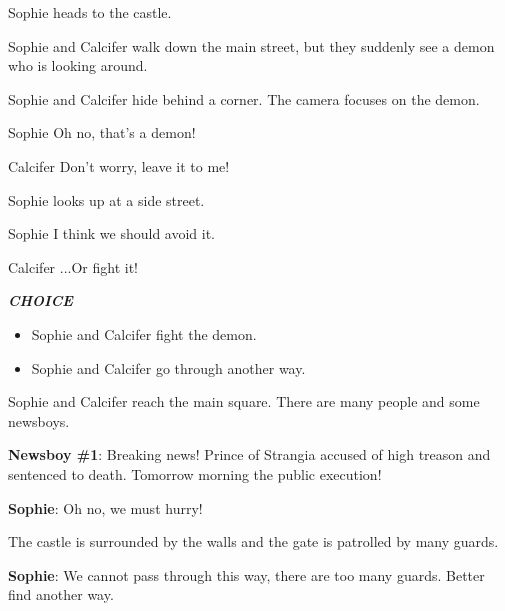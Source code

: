 \vspace{1em}

Sophie heads to the castle.


Sophie and Calcifer walk down the main street, but they suddenly see a demon who is looking around.

\begin{screenplay}

Sophie and Calcifer hide behind a corner. The camera focuses on the demon.

\begin{dialogue}[worried]{Sophie}
Oh no, that’s a demon!
\end{dialogue}
\begin{dialogue}[feisty]{Calcifer}
Don’t worry, leave it to me!
\end{dialogue}

Sophie looks up at a side street.

\begin{dialogue}{Sophie}
I think we should avoid it.
\end{dialogue}

\begin{dialogue}{Calcifer}
...Or fight it!
\end{dialogue}
\end{screenplay}
\vspace{1em}

\textit{\textbf{CHOICE}}
\begin{itemize}
  \item Sophie and Calcifer fight the demon.
  \item Sophie and Calcifer go through another way.
\end{itemize}
  
Sophie and Calcifer reach the main square. There are many people and some newsboys.

\textbf{Newsboy \#{}1}: Breaking news! Prince of Strangia accused of high treason and sentenced to death. Tomorrow morning the public execution!

\textbf{Sophie}: Oh no, we must hurry!

The castle is surrounded by the walls and the gate is patrolled by many guards.


\textbf{Sophie}: We cannot pass through this way, there are too many guards. Better find another way.

